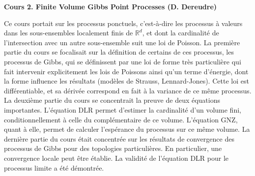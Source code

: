 \documentclass[a4paper, 11pt]{article}
\begin{document}
\begin{center} \textbf{Cours 2. Finite Volume Gibbs Point Processes (D. Dereudre)} \end{center}

Ce cours portait sur les processus ponctuels, c'est-\`a-dire les processus \`a valeurs dans les sous-ensembles localement finis
de $\mathbb{R}^d$, et dont la cardinalit\'e de l'intersection avec un autre sous-ensemble suit une loi de Poisson.
La premi\`ere partie du cours se focalisait sur la d\'efinition de certains de ces processus, 
les processus de Gibbs, qui se d\'efinissent par une loi de forme tr\`es particuli\`ere qui fait intervenir
explicitement les lois de Poissons ainsi qu'un terme d'\'energie, dont la forme influence les r\'esultats (mod\`eles de Strauss, Lennard-Jones).
Cette loi est diff\'erentiable, et sa d\'eriv\'ee correspond en fait \`a la variance de ce même processus.
La deuxi\`eme partie du cours se concentrait la preuve de deux \'equations importantes.
L'\'equation DLR permet d'estimer la cardinalit\'e d'un volume fini, conditionnellement \`a celle du compl\'ementaire de ce volume.
L'\'equation GNZ, quant \`a elle, permet de calculer l'esp\'erance du processus sur ce même volume.
La derni\`ere partie du cours \'etait concentr\'ee sur les r\'esultats de convergence des processus de Gibbs
pour des topologies particuli\`eres. En particulier, une convergence locale peut être \'etablie.
La validit\'e de l'\'equation DLR pour le processus limite a \'et\'e d\'emontr\'ee.
\end{document}
